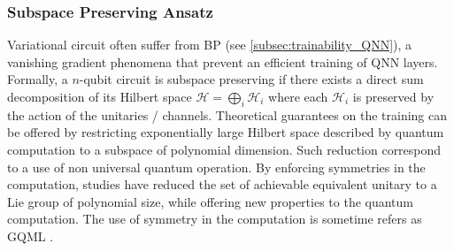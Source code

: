 \documentclass[aps,10pt,groupedaddress,prx,superscriptaddress,twocolumn,balancelastpage, tightenlines]{revtex4-2}
\theoremstyle{plain}  %
\begin{document}
\subsubsection{Subspace Preserving Ansatz}\label{subsec:Subspace_Preserving}

Variational circuit often suffer from \gls{BP} (see \autoref{subsec:trainability_QNN}), a vanishing gradient phenomena that prevent an efficient training of QNN layers. Formally, a $n$-qubit circuit is
subspace preserving if there exists a direct sum decomposition of its Hilbert
space $\mathcal{H} = \bigoplus_i \mathcal{H}_i$ where each $\mathcal{H}_i$ is
preserved by the action of the unitaries / channels. Theoretical guarantees
\cite{larocca_diagnosing_2022, ragone_lie_2024, fontana_characterizing_2024,
lee_progress_2021} on the training can be offered by restricting exponentially
large Hilbert space described by quantum computation to a subspace of
polynomial dimension. Such reduction correspond to a use of non universal
quantum operation. By enforcing symmetries in the computation, studies have
reduced the set of achievable equivalent unitary to a Lie group of polynomial
size, while offering new properties to the quantum computation. The use of symmetry in the computation is sometime refers as \Gls{GQML} \cite{larocca_group-invariant_2022, meyer_exploiting_2023,zheng_speeding_2023, west_provably_2024}.
\end{document}
